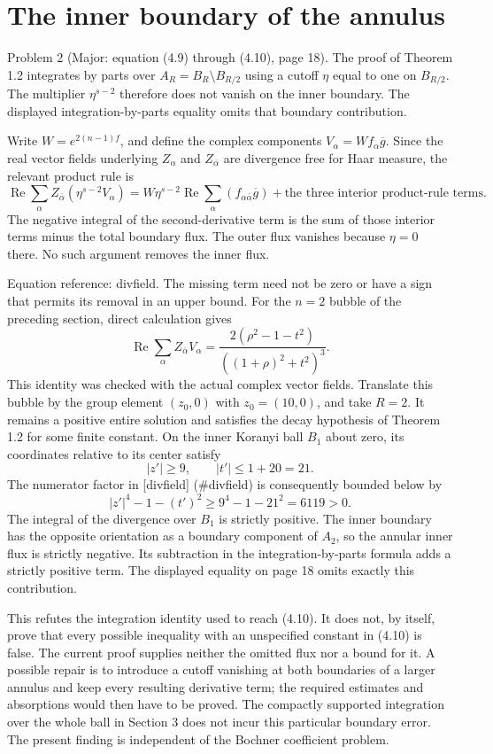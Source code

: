 \documentclass[10pt]{article}
\begin{document}
\section*{The inner boundary of the annulus}
Problem 2 (Major: equation (4.9) through (4.10), page 18).  The proof of Theorem 1.2 integrates by parts over \(A_R=B_R\setminus B_{R/2}\) using a cutoff \(\eta\) equal to one on \(B_{R/2}\). The multiplier \(\eta^{s-2}\) therefore does not vanish on the inner boundary. The displayed integration-by-parts equality omits that boundary contribution.\par
Write \(W=e^{2(n-1)f}\), and define the complex components \(V_\alpha=W f_\alpha\overline g\). Since the real vector fields underlying \(Z_\alpha\) and \(Z_{\bar\alpha}\) are divergence free for Haar measure, the relevant product rule is \[\operatorname{Re}\sum_\alpha Z_{\bar\alpha}
       (\eta^{s-2}V_\alpha)
 =W\eta^{s-2}\operatorname{Re}
       \sum_\alpha(f_{\alpha\bar\alpha}\overline g)
       +\text{the three interior product-rule terms}.\] The negative integral of the second-derivative term is the sum of those interior terms minus the total boundary flux. The outer flux vanishes because \(\eta=0\) there. No such argument removes the inner flux.\par
Equation reference: divfield. The missing term need not be zero or have a sign that permits its removal in an upper bound. For the \(n=2\) bubble of the preceding section, direct calculation gives \[
 \operatorname{Re}\sum_\alpha Z_{\bar\alpha}V_\alpha
   =\frac{2(\rho^2-1-t^2)}{((1+\rho)^2+t^2)^3}.\] This identity was checked with the actual complex vector fields. Translate this bubble by the group element \((z_0,0)\) with \(z_0=(10,0)\), and take \(R=2\). It remains a positive entire solution and satisfies the decay hypothesis of Theorem 1.2 for some finite constant. On the inner Koranyi ball \(B_1\) about zero, its coordinates relative to its center satisfy \[|z'|\geq9,\qquad |t'|\leq1+20=21.\] The numerator factor in [divfield] (\#divfield) is consequently bounded below by \[|z'|^4-1-(t')^2\geq9^4-1-21^2=6119>0.\] The integral of the divergence over \(B_1\) is strictly positive. The inner boundary has the opposite orientation as a boundary component of \(A_2\), so the annular inner flux is strictly negative. Its subtraction in the integration-by-parts formula adds a strictly positive term. The displayed equality on page 18 omits exactly this contribution.\par
This refutes the integration identity used to reach (4.10). It does not, by itself, prove that every possible inequality with an unspecified constant in (4.10) is false. The current proof supplies neither the omitted flux nor a bound for it. A possible repair is to introduce a cutoff vanishing at both boundaries of a larger annulus and keep every resulting derivative term; the required estimates and absorptions would then have to be proved. The compactly supported integration over the whole ball in Section 3 does not incur this particular boundary error. The present finding is independent of the Bochner coefficient problem.\par
\end{document}
